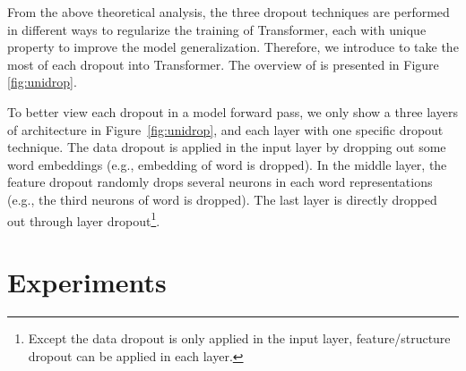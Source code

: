 \documentclass[11pt]{article}
\begin{document}
From the above theoretical analysis, the three dropout techniques are performed in different ways to regularize the training of Transformer, each with unique property to improve the model generalization. Therefore, we introduce  to take the most of each dropout into Transformer. The overview of  is presented in Figure \ref{fig:unidrop}. 

To better view each dropout in a model forward pass, we only show a three layers of architecture in Figure~\ref{fig:unidrop}, and each layer with one specific dropout technique. The data dropout is applied in the input layer by dropping out some word embeddings (e.g., embedding of word  is dropped). In the middle layer, the feature dropout randomly drops several neurons in each word representations (e.g., the third neurons of word  is dropped). The last layer is directly dropped out through layer dropout\footnote{Except the data dropout is only applied in the input layer, feature/structure dropout can be applied in each layer.}. 



\section{Experiments}
\end{document}
